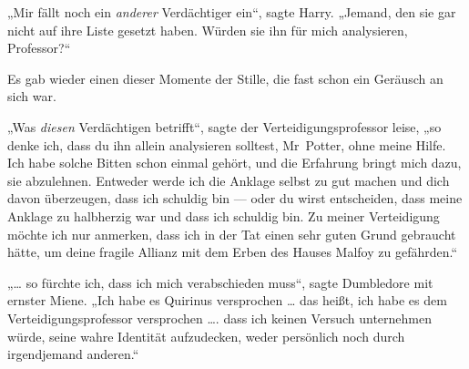 „Mir fällt noch ein \emph{anderer} Verdächtiger ein“, sagte Harry.
„Jemand, den sie gar nicht auf ihre Liste gesetzt haben. Würden sie ihn für mich analysieren, Professor?“

Es gab wieder einen dieser Momente der Stille, die fast schon ein Geräusch an sich war.

„Was \emph{diesen} Verdächtigen betrifft“, sagte der Verteidigungsprofessor leise, „so denke ich, dass du ihn allein analysieren solltest, Mr~Potter, ohne meine Hilfe. Ich habe solche Bitten schon einmal gehört, und die Erfahrung bringt mich dazu, sie abzulehnen. Entweder werde ich die Anklage selbst zu gut machen und dich davon überzeugen, dass ich schuldig bin — oder du wirst entscheiden, dass meine Anklage zu halbherzig war und dass ich schuldig bin. Zu meiner Verteidigung möchte ich nur anmerken, dass ich in der Tat einen sehr guten Grund gebraucht hätte, um deine fragile Allianz mit dem Erben des Hauses Malfoy zu gefährden.“


„… so fürchte ich, dass ich mich verabschieden muss“, sagte Dumbledore mit ernster Miene.
„Ich habe es Quirinus versprochen … das heißt, ich habe es dem Verteidigungsprofessor versprochen …. dass ich keinen Versuch unternehmen würde, seine wahre Identität aufzudecken, weder persönlich noch durch irgendjemand anderen.“

